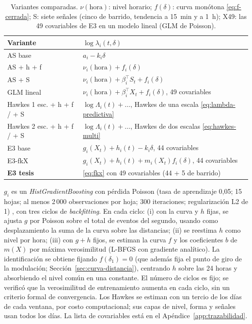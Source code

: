 \begin{table}[htbp]
\centering\small
\caption[Especificaciones comparadas.]{Variantes comparadas. $\nu(\text{hora})$: nivel horario; $f(\delta)$: curva monótona \eqref{eq:f-cerrada}; S: siete señales (cinco de barrido, tendencia a 15~min y a 1~h); X49: las 49 covariables de E3 en un modelo lineal (GLM de Poisson).}
\label{tab:modelos}
\begin{tabular}{@{}lp{}@{}}\toprule
Variante & $\log\lambda_i(t,\delta)$\\\midrule
AS base & $a_i-k_i\delta$\\
AS + h + f & $\nu_i(\text{hora})+f_i(\delta)$\\
AS + S & $\nu_i(\text{hora})+\beta_i^\top S_t+f_i(\delta)$\\
GLM lineal & $\nu_i(\text{hora})+\beta_i^\top X_t+f_i(\delta)$, 49 covariables\\
Hawkes 1 esc. + h + f / + S & $\log\Lambda_i(t)+\dots$, Hawkes de una escala \eqref{eq:lambda-predictiva}\\
Hawkes 2 esc. + h + f / + S & $\log\Lambda_i(t)+\dots$, Hawkes de dos escalas \eqref{eq:hawkes-multi}\\
E3 base & $g_i(X_t)+h_i(t)-k_i\delta$, 44 covariables\\
E3-fkX & $g_i(X_t)+h_i(t)+m_i(X_t)f_i(\delta)$, 44 covariables\\
\textbf{E3 tesis} & \eqref{eq:fkx} con 49 covariables (44 + 5 de barrido)\\\bottomrule
\end{tabular}
\end{table}

$g_i$ es un \textit{HistGradientBoosting} con pérdida Poisson (tasa de aprendizaje 0,05; 15 hojas; al menos 2\,000 observaciones por hoja; 300 iteraciones; regularización L2 de 1) \citep{PedregosaEtAl2011}, con tres ciclos de \textit{backfitting}. En cada ciclo: (i) con la curva y $h$ fijas, se ajusta $g$ por Poisson sobre el total de eventos del segundo, usando como desplazamiento la suma de la curva sobre las distancias; (ii) se reestima $h$ como nivel por hora; (iii) con $g+h$ fijos, se estiman la curva $f$ y los coeficientes $b$ de $m(X)$ por máxima verosimilitud (L-BFGS con gradiente analítico). La identificación se obtiene fijando $f(\delta_1)=0$ (que además fija el punto de giro de la modulación; Sección~\ref{sec:curva-distancia}), centrando $h$ sobre las 24 horas y absorbiendo el nivel común en una constante. El número de ciclos es fijo; se verificó que la verosimilitud de entrenamiento aumenta en cada ciclo, sin un criterio formal de convergencia. Los Hawkes se estiman con un tercio de los días de cada ventana, por costo computacional; sus capas de nivel, forma y señales usan todos los días. La lista de covariables está en el Apéndice~\ref{app:trazabilidad}.

